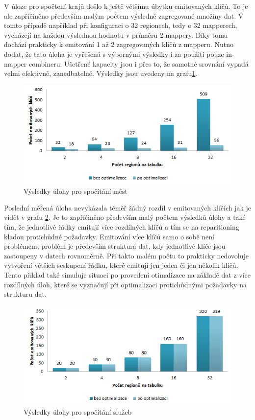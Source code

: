 \documentclass[thesis=M,czech]{FITthesis}[2012/06/26]
\begin{document}
V úloze pro spočtení krajů došlo k ještě většímu úbytku emitovaných klíčů. To je ale zapříčiněno především malým počtem výsledné zagregované množiny dat. V tomto případě například při konfiguraci o 32 regionech, tedy o 32 mapperech, vycházejí na každou výslednou hodnotu v průměru 2 mappery. Díky tomu dochází prakticky k emitování 1 až 2 zagregovaných klíčů z mapperu. Nutno dodat, že tato úloha je vyřešená s výbornými výsledky i za použití pouze in-mapper combineru. Ušetřené kapacity jsou i přes to, že samotné srovnání vypadá velmi efektivně, zanedbatelné. Výsledky jsou uvedeny na grafu\ref{fig:kraje}. 
\begin{figure}[h]\centering
	\includegraphics[width=1\textwidth, angle=0]{files/kraje}
	\caption[Výsledky úlohy pro spočítání krajů]
	{Výsledky úlohy pro spočítání měst}\label{fig:kraje}
\end{figure}
Poslední měřená úloha nevykázala téměř žádný rozdíl v emitovaných klíčích jak je vidět v grafu \ref{fig:sluzby}. Je to zapříčiněno především malý počtem výsledků úlohy a také tím, že jednotlivé řádky emitují více rozdílných klíčů a tím se na reparitioning kladou protichůdné požadavky. Emitování více klíčů samo o sobě není problémem, problém je především struktura dat, kdy jednotlivé klíče jsou zastoupeny v datech rovnoměrně. Při takto malém počtu to prakticky nedovoluje vytvoření větších seskupení řádku, které emitují jen jeden či jen několik klíčů. Tento příklad také simuluje situaci po provedení otimalizace na základě dat z více rozdílných úloh, které se vyznačují při optimalizaci protichůdnými požadavky na strukturu dat.
\begin{figure}[h]\centering
	\includegraphics[width=1\textwidth, angle=0]{files/sluzby}
	\caption[Výsledky úlohy pro spočítání služeb]
	{Výsledky úlohy pro spočítání služeb}\label{fig:sluzby}
\end{figure}
\end{document}

